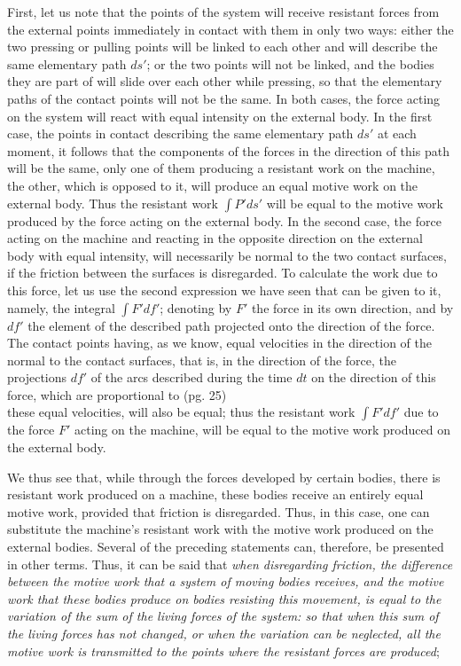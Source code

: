 \documentclass{book}
\begin{document}
First, let us note that the points of the system will receive resistant forces from the external points immediately in contact with them in only two ways: either the two pressing or pulling points will be linked to each other and will describe the same elementary path \( ds' \); or the two points will not be linked, and the bodies they are part of will slide over each other while pressing, so that the elementary paths of the contact points will not be the same. In both cases, the force acting on the system will react with equal intensity on the external body. In the first case, the points in contact describing the same elementary path \( ds' \) at each moment, it follows that the components of the forces in the direction of this path will be the same, only one of them producing a resistant work on the machine, the other, which is opposed to it, will produce an equal motive work on the external body. Thus the resistant work \( \int P' ds' \) will be equal to the motive work produced by the force acting on the external body. In the second case, the force acting on the machine and reacting in the opposite direction on the external body with equal intensity, will necessarily be normal to the two contact surfaces, if the friction between the surfaces is disregarded. To calculate the work due to this force, let us use the second expression we have seen that can be given to it, namely, the integral \( \int F' df' \); denoting by \( F' \) the force in its own direction, and by \( df' \) the element of the described path projected onto the direction of the force. The contact points having, as we know, equal velocities in the direction of the normal to the contact surfaces, that is, in the direction of the force, the projections \( df' \) of the arcs described during the time \( dt \) on the direction of this force, which are proportional to
\newpage
(pg. 25)\\
these equal velocities, will also be equal; thus the resistant work \( \int F' df' \) due to the force \( F' \) acting on the machine, will be equal to the motive work produced on the external body.

We thus see that, while through the forces developed by certain bodies, there is resistant work produced on a machine, these bodies receive an entirely equal motive work, provided that friction is disregarded. Thus, in this case, one can substitute the machine's resistant work with the motive work produced on the external bodies. Several of the preceding statements can, therefore, be presented in other terms. Thus, it can be said that \textit{when disregarding friction, the difference between the motive work that a system of moving bodies receives, and the motive work that these bodies produce on bodies resisting this movement, is equal to the variation of the sum of the living forces of the system: so that when this sum of the living forces has not changed, or when the variation can be neglected, all the motive work is transmitted to the points where the resistant forces are produced};
\end{document}

